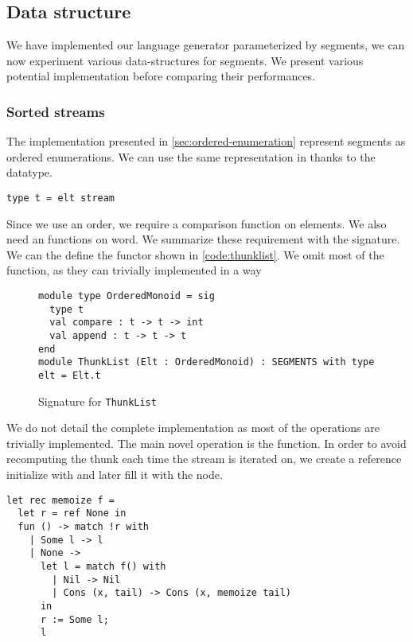 \subsection{Data structure}

We have implemented our language generator parameterized by segments, we can now
experiment various data-structures for segments. We present various
potential implementation before comparing their performances.

\subsubsection{Sorted streams}

The \haskell implementation presented in \autoref{sec:ordered-enumeration}
represent segments as ordered enumerations. We can use
the same representation in \ocaml thanks to the  datatype.
\begin{lstlisting}[numbers=none]
type t = elt stream
\end{lstlisting}

Since we use an order, we require a comparison function on elements.
We also need an  functions on word. We summarize these requirement
with the  signature.
We can the define the  functor shown in \autoref{code:thunklist}.
We omit most of the function, as they can trivially implemented in a way

\begin{figure}
  \centering
\begin{lstlisting}
module type OrderedMonoid = sig
  type t
  val compare : t -> t -> int
  val append : t -> t -> t
end
module ThunkList (Elt : OrderedMonoid) : SEGMENTS with type elt = Elt.t
\end{lstlisting}
  \caption{Signature for \texttt{ThunkList}}
  \label{code:thunklist}
\end{figure}

We do not detail the complete implementation as most of the operations are trivially implemented. The main novel operation is the  function.
In order to avoid recomputing the thunk each time the stream is iterated on,
we create a reference initialize with  and later fill it with the
node.
\begin{lstlisting}
let rec memoize f =
  let r = ref None in
  fun () -> match !r with
    | Some l -> l
    | None ->
      let l = match f() with
        | Nil -> Nil
        | Cons (x, tail) -> Cons (x, memoize tail)
      in
      r := Some l;
      l
\end{lstlisting}



